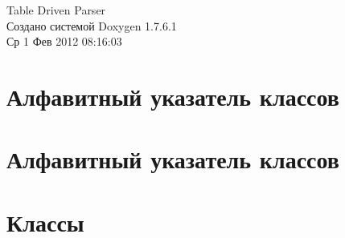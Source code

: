 \documentclass[a4paper]{book}
\begin{document}
\begin{titlepage}
\vspace*{7cm}
\begin{center}
{\Large \-Table \-Driven \-Parser }\\
\vspace*{1cm}
{\large Создано системой Doxygen 1.7.6.1}\\
\vspace*{0.5cm}
{\small Ср 1 Фев 2012 08:16:03}\\
\end{center}
\end{titlepage}
\clearemptydoublepage
{}
\tableofcontents
\clearemptydoublepage
{}
\chapter{Алфавитный указатель классов}

\chapter{Алфавитный указатель классов}

\chapter{Классы}







\printindex
\end{document}
